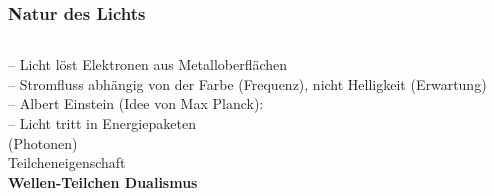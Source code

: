 \begin{frame}
	\frametitle{Natur des Lichts}
	\begin{columns}
		\begin{column}{0.48\linewidth}
			-- Licht l{\"o}st Elektronen aus Metalloberflächen\\
			-- Stromfluss abh{\"a}ngig von der Farbe (Frequenz), nicht Helligkeit (Erwartung)\\ 
			-- Albert Einstein (Idee von Max Planck):\\
			\hspace{0.8em} -- Licht tritt in Energiepaketen\\
			\hspace{1.5em} (Photonen) \textbf{\textrightarrow}\\
			\hspace{1.5em} Teilcheneigenschaft\\
			\textbf{\textrightarrow{ }Wellen-Teilchen Dualismus}
		\end{column}
		\begin{column}{0.48\linewidth}
		\end{column}
	\end{columns}
\end{frame}

